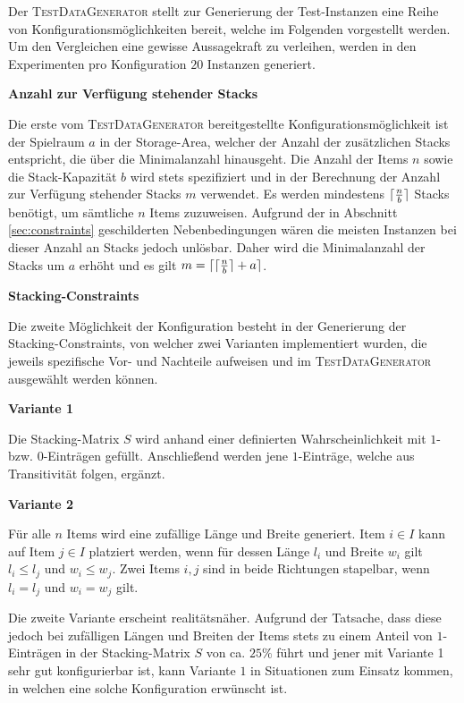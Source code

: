 \vfill
\pagebreak

Der \textsc{TestDataGenerator} stellt zur Generierung der Test-Instanzen eine Reihe von Konfigurationsmöglichkeiten
bereit, welche im Folgenden vorgestellt werden. Um den Vergleichen eine gewisse Aussagekraft zu verleihen,
werden in den Experimenten pro Konfiguration $20$ Instanzen generiert.\newline

\textbf{Anzahl zur Verfügung stehender Stacks}

Die erste vom \textsc{TestDataGenerator} bereitgestellte Konfigurationsmöglichkeit ist der Spielraum $a$ in der Storage-Area, welcher der Anzahl der zusätzlichen Stacks entspricht, die über die Minimalanzahl hinausgeht.
Die Anzahl der Items $n$ sowie die Stack-Kapazität $b$ wird stets spezifiziert und in der Berechnung der Anzahl zur Verfügung stehender Stacks $m$ verwendet. Es werden mindestens $\lceil\frac{n}{b}\rceil$ Stacks benötigt, um sämtliche $n$ Items zuzuweisen.
Aufgrund der in Abschnitt \ref{sec:constraints} geschilderten Nebenbedingungen wären die meisten Instanzen bei dieser
Anzahl an Stacks jedoch unlösbar. Daher wird die Minimalanzahl der Stacks um $a$ erhöht und es gilt
$m = \lceil\lceil\frac{n}{b}\rceil + a\rceil$.\newline

\textbf{Stacking-Constraints}

Die zweite Möglichkeit der Konfiguration besteht in der Generierung der Stacking-Constraints,
von welcher zwei Varianten implementiert wurden, die jeweils spezifische Vor- und Nachteile aufweisen
und im \textsc{TestDataGenerator} ausgewählt werden können.\newline

\textbf{Variante 1}

Die Stacking-Matrix $S$ wird anhand einer definierten Wahrscheinlichkeit mit $1$- bzw. $0$-Einträgen gefüllt. Anschließend werden jene $1$-Einträge, welche aus Transitivität folgen, ergänzt.\newline

\textbf{Variante 2}

Für alle $n$ Items wird eine zufällige Länge und Breite generiert. Item $i \in I$ kann auf Item $j \in I$
platziert werden, wenn für dessen Länge $l_i$ und Breite $w_i$ gilt $l_i \leq l_j$ und $w_i \leq w_j$.
Zwei Items $i, j$ sind in beide Richtungen stapelbar, wenn $l_i = l_j$ und $w_i = w_j$ gilt.

Die zweite Variante erscheint realitätsnäher. Aufgrund der Tatsache, dass diese jedoch bei zufälligen Längen und
Breiten der Items stets zu einem Anteil von $1$-Einträgen in der Stacking-Matrix $S$ von ca. $25\%$ führt
und jener mit Variante 1 sehr gut konfigurierbar ist, kann Variante $1$ in Situationen zum Einsatz kommen,
in welchen eine solche Konfiguration erwünscht ist.

